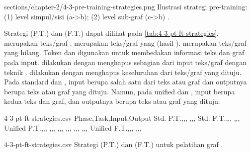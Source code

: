   {sections/chapter-2/4-3-pre-training-strategies.png}
  {Ilustrasi strategi pre-training: (1) \denoising{} level simpul/sisi (a->b); (2) \denoising{} level sub-graf (c->b) .}

Strategi \pretraining{} (P.T.) dan \finetuning{} (F.T.) dapat dilihat pada \cref{tab:4-3-pt-ft-strategies}.
 merupakan teks/graf .
 merupakan teks/graf yang  (hasil \denoising{}).
 merupakan teks/graf yang hilang.
Token  dan  digunakan untuk membedakan informasi teks dan graf pada input.
\Pretraining{} dilakukan dengan menghapus sebagian dari input teks/graf dengan teknik \denoising{}.
\Finetuning{} dilakukan dengan menghapus keseluruhan dari teks/graf yang dituju.
Pada standard \pretraining{} dan \finetuning{}, input berupa salah satu dari teks atau graf dan outputnya berupa teks atau graf yang dituju.
Namun, pada unified \pretraining{} dan \finetuning{}, input berupa kedua teks dan graf, dan outputnya berupa teks atau graf yang dituju.

\begin{filecontents*}{4-3-pt-ft-strategies.csv}
Phase,Task,Input,Output
Std. P.T.,,,
,,,
Std. F.T.,,,
,,,
Unified P.T.,,,
,,,
,,,
,,,
,,,
,,,
Unified F.T.,,,
,,,
\end{filecontents*}
  {4-3-pt-ft-strategies.csv}
  {Strategi \pretraining{} (P.T.) dan \finetuning{} (F.T.) untuk pelatihan graf .}
